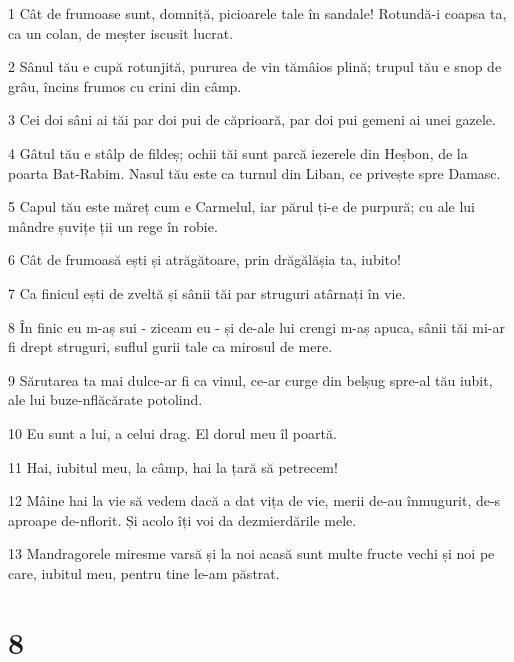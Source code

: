 \par 1 Cât de frumoase sunt, domniță, picioarele tale în sandale! Rotundă-i coapsa ta, ca un colan, de meșter iscusit lucrat.
\par 2 Sânul tău e cupă rotunjită, pururea de vin tămâios plină; trupul tău e snop de grâu, încins frumos cu crini din câmp.
\par 3 Cei doi sâni ai tăi par doi pui de căprioară, par doi pui gemeni ai unei gazele.
\par 4 Gâtul tău e stâlp de fildeș; ochii tăi sunt parcă iezerele din Heșbon, de la poarta Bat-Rabim. Nasul tău este ca turnul din Liban, ce privește spre Damasc.
\par 5 Capul tău este măreț cum e Carmelul, iar părul ți-e de purpură; cu ale lui mândre șuvițe ții un rege în robie.
\par 6 Cât de frumoasă ești și atrăgătoare, prin drăgălășia ta, iubito!
\par 7 Ca finicul ești de zveltă și sânii tăi par struguri atârnați în vie.
\par 8 În finic eu m-aș sui - ziceam eu - și de-ale lui crengi m-aș apuca, sânii tăi mi-ar fi drept struguri, suflul gurii tale ca mirosul de mere.
\par 9 Sărutarea ta mai dulce-ar fi ca vinul, ce-ar curge din belșug spre-al tău iubit, ale lui buze-nflăcărate potolind.
\par 10 Eu sunt a lui, a celui drag. El dorul meu îl poartă.
\par 11 Hai, iubitul meu, la câmp, hai la țară să petrecem!
\par 12 Mâine hai la vie să vedem dacă a dat vița de vie, merii de-au înmugurit, de-s aproape de-nflorit. Și acolo îți voi da dezmierdările mele.
\par 13 Mandragorele miresme varsă și la noi acasă sunt multe fructe vechi și noi pe care, iubitul meu, pentru tine le-am păstrat.

\chapter{8}

